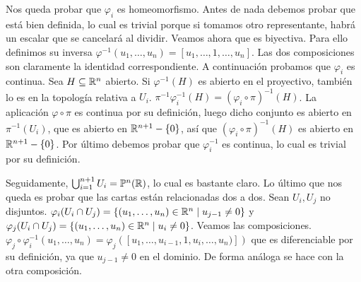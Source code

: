 \documentclass[twoside]{article}
\begin{document}
\begin{solucion}
Nos queda probar que $\varphi_i$ es homeomorfismo. Antes de nada debemos probar que está bien definida, lo cual es trivial porque si tomamos otro representante, habrá un escalar que se cancelará al dividir. Veamos ahora que es biyectiva. Para ello definimos su inversa $\varphi^{-1}(u_1,\dots,u_n)=[u_1,\dots,1,\dots,u_n]$. Las dos composiciones son claramente la identidad correspondiente. A continuación probamos que $\varphi_i$ es continua. Sea $H\subseteq\mathbb{R}^n$ abierto. Si $\varphi^{-1}(H)$ es abierto en el proyectivo, también lo es en la topología relativa a $U_i$. $\pi^{-1}\varphi_i^{-1}(H)=(\varphi_i\circ\pi)^{-1}(H)$. La aplicación $\varphi\circ\pi$ es continua por su definición, luego dicho conjunto es abierto en $\pi^{-1}(U_i)$, que es abierto en $\mathbb{R}^{n+1}-\{0\}$, así que $(\varphi_i\circ\pi)^{-1}(H)$ es abierto en $\mathbb{R}^{n+1}-\{0\}$. Por último debemos probar que $\varphi_i^{-1}$ es continua, lo cual es trivial por su definición.

Seguidamente, $\bigcup_{i=1}^{n+1} U_i=\mathbb{P}^n(\mathbb{R})$, lo cual es bastante claro. Lo último que nos queda es probar que las cartas están relacionadas dos a dos. Sean $U_i,U_j$ no disjuntos. $\varphi_i(U_i\cap U_j)=\{(u_1,\dots,u_n)\in\mathbb{R}^n\mid u_{j-1}\neq 0\}$ y $\varphi_j(U_i\cap U_j)=\{(u_1,\dots,u_n)\in\mathbb{R}^n\mid u_{i}\neq 0\}$. Veamos las composiciones. $\varphi_j\circ\varphi^{-1}_i(u_1,\dots,u_n)=\varphi_j([u_1,\dots,u_{i-1},1,u_i,\dots,u_n)])$ que es diferenciable por su definición, ya que $u_{j-1}\neq 0$ en el dominio. De forma análoga se hace con la otra composición.
\end{solucion}
\end{document}
